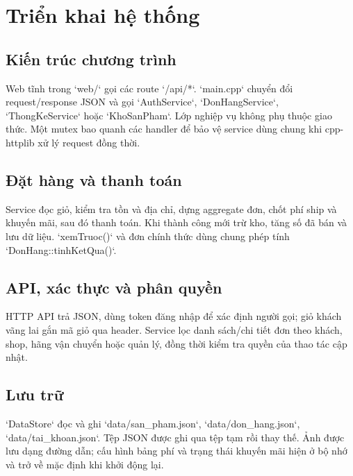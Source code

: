 \chapter{Triển khai hệ thống}
\section{Kiến trúc chương trình}
Web tĩnh trong `web/` gọi các route `/api/*`. `main.cpp` chuyển đổi request/response JSON và gọi `AuthService`, `DonHangService`, `ThongKeService` hoặc `KhoSanPham`. Lớp nghiệp vụ không phụ thuộc giao thức. Một mutex bao quanh các handler để bảo vệ service dùng chung khi cpp-httplib xử lý request đồng thời.

\section{Đặt hàng và thanh toán}
Service đọc giỏ, kiểm tra tồn và địa chỉ, dựng aggregate đơn, chốt phí ship và khuyến mãi, sau đó thanh toán. Khi thành công mới trừ kho, tăng số đã bán và lưu dữ liệu. `xemTruoc()` và đơn chính thức dùng chung phép tính `DonHang::tinhKetQua()`.

\section{API, xác thực và phân quyền}
HTTP API trả JSON, dùng token đăng nhập để xác định người gọi; giỏ khách vãng lai gắn mã giỏ qua header. Service lọc danh sách/chi tiết đơn theo khách, shop, hãng vận chuyển hoặc quản lý, đồng thời kiểm tra quyền của thao tác cập nhật.

\section{Lưu trữ}
`DataStore` đọc và ghi `data/san_pham.json`, `data/don_hang.json`, `data/tai_khoan.json`. Tệp JSON được ghi qua tệp tạm rồi thay thế. Ảnh được lưu dạng đường dẫn; cấu hình bảng phí và trạng thái khuyến mãi hiện ở bộ nhớ và trở về mặc định khi khởi động lại.
